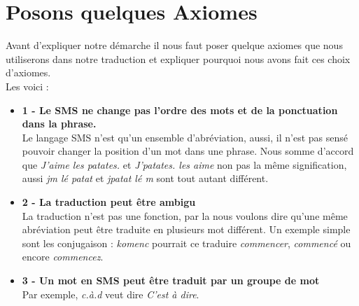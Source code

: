 \documentclass[11pt]{report}
\begin{document}
	\section{Posons quelques Axiomes}
	Avant d'expliquer notre démarche il nous faut poser quelque axiomes que nous utiliserons dans notre traduction et expliquer pourquoi nous avons fait ces choix d'axiomes.\\
	Les voici : \\
	\begin{itemize}
		\item \textbf{1 - Le SMS ne change pas l'ordre des mots et de la ponctuation dans la phrase.}\\
		Le langage SMS n'est qu'un ensemble d'abréviation, aussi, il n'est pas sensé pouvoir changer la position d'un mot dans une phrase. Nous somme d'accord que {\em J'aime les patates.} et {\em J'patates. les aime} non pas la même signification, aussi {\em jm lé patat} et {\em jpatat lé m} sont tout autant différent.\\
		
		\item \textbf{2 - La traduction peut être ambigu}\\
		La traduction n'est pas une fonction, par la nous voulons dire qu'une même abréviation peut être traduite en plusieurs mot différent. Un exemple simple sont les conjugaison : {\em komenc} pourrait ce traduire {\em commencer}, {\em commencé} ou encore {\em commencez}.\\
		
		\item \textbf{3 - Un mot en SMS peut être traduit par un groupe de mot}\\
		Par exemple, {\em c.à.d} veut dire {\em C'est à dire}.\\
		

\end{itemize}
\end{document}
